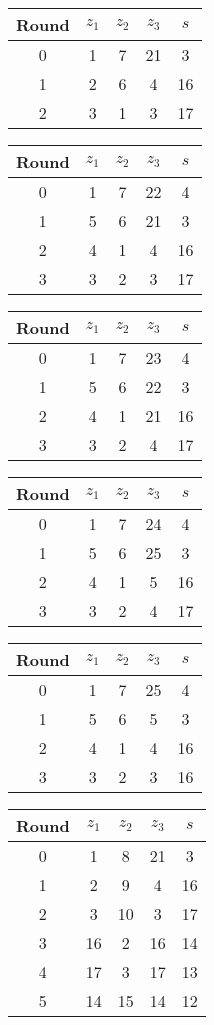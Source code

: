 \begin{multicols}{2}
\begin{tabular}{c | c | c | c | c }
Round & $z_1$ & $z_2$ & $z_3$ & $s$ \\
\hline
0 & 1 & 7 & 21 & 3 \\
1 & 2 & 6 & 4 & 16 \\
2 & 3 & 1 & 3 & 17
\end{tabular}


\begin{tabular}{c | c | c | c | c }
Round & $z_1$ & $z_2$ & $z_3$ & $s$ \\
\hline
0 & 1 & 7 & 22 & 4 \\
1 & 5 & 6 & 21 & 3 \\
2 & 4 & 1 & 4 & 16 \\
3 & 3 & 2 & 3 & 17
\end{tabular}


\begin{tabular}{c | c | c | c | c }
Round & $z_1$ & $z_2$ & $z_3$ & $s$ \\
\hline
0 & 1 & 7 & 23 & 4 \\
1 & 5 & 6 & 22 & 3 \\
2 & 4 & 1 & 21 & 16 \\
3 & 3 & 2 & 4 & 17
\end{tabular}


\begin{tabular}{c | c | c | c | c }
Round & $z_1$ & $z_2$ & $z_3$ & $s$ \\
\hline
0 & 1 & 7 & 24 & 4 \\
1 & 5 & 6 & 25 & 3 \\
2 & 4 & 1 & 5 & 16 \\
3 & 3 & 2 & 4 & 17
\end{tabular}


\begin{tabular}{c | c | c | c | c }
Round & $z_1$ & $z_2$ & $z_3$ & $s$ \\
\hline
0 & 1 & 7 & 25 & 4 \\
1 & 5 & 6 & 5 & 3 \\
2 & 4 & 1 & 4 & 16 \\
3 & 3 & 2 & 3 & 16
\end{tabular}


\begin{tabular}{c | c | c | c | c }
Round & $z_1$ & $z_2$ & $z_3$ & $s$ \\
\hline
0 & 1 & 8 & 21 & 3 \\
1 & 2 & 9 & 4 & 16 \\
2 & 3 & 10 & 3 & 17 \\
3 & 16 & 2 & 16 & 14 \\
4 & 17 & 3 & 17 & 13 \\
5 & 14 & 15 & 14 & 12
\end{tabular}



\end{multicols}
